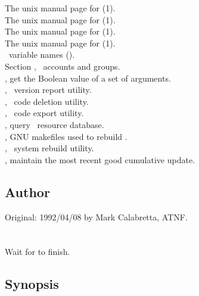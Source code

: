 The unix manual page for (1).\\
The unix manual page for (1).\\
The unix manual page for (1).\\
The unix manual page for (1).\\
\aipspp\ variable names ().\\
Section , \aipspp\ accounts and groups.\\
, get the Boolean value of a set of arguments.\\
, \aipspp\ version report utility.\\
, \aipspp\ code deletion utility.\\
, \aipspp\ code export utility.\\
, query \aipspp\ resource database.\\
, GNU makefiles used to rebuild \aipspp .\\
, \aipspp\ system rebuild utility.\\
, maintain the most recent good cumulative update.

\subsection*{Author}

Original: 1992/04/08 by Mark Calabretta, ATNF.

 
\newpage
\section{}
\label{inhold}
 
Wait for  to finish.

\subsection*{Synopsis}
 
\begin{synopsis}
\end{synopsis}
 
